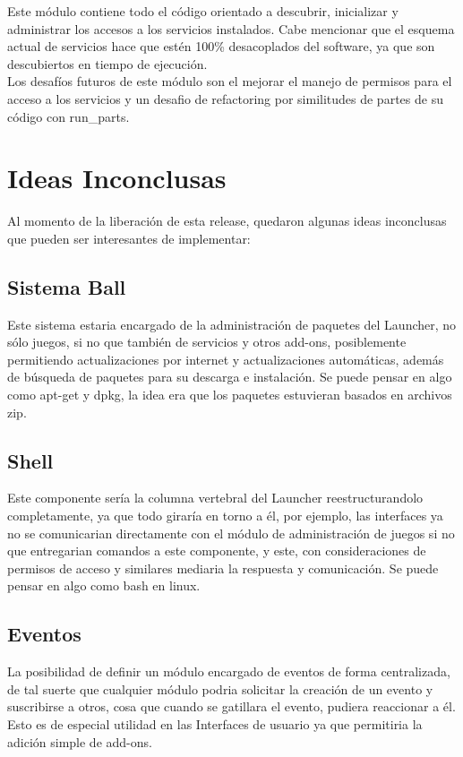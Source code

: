 \documentclass[language=spanish]{article}
\begin{document}
Este módulo contiene todo el código orientado a descubrir, inicializar y administrar los accesos a los servicios instalados. Cabe mencionar que el esquema actual de servicios hace que estén 100\% desacoplados del software, ya que son descubiertos en tiempo de ejecución.\\

Los desafíos futuros de este módulo son el mejorar el manejo de permisos para el acceso a los servicios y un desafio de refactoring por similitudes de partes de su código con run\_parts.

\section{Ideas Inconclusas}

Al momento de la liberación de esta release, quedaron algunas ideas inconclusas que pueden ser interesantes de implementar:

\subsection{Sistema Ball}

Este sistema estaria encargado de la administración de paquetes del Launcher, no sólo juegos, si no que también de servicios y otros add-ons, posiblemente permitiendo actualizaciones por internet y actualizaciones automáticas, además de búsqueda de paquetes para su descarga e instalación. Se puede pensar en algo como apt-get y dpkg, la idea era que los paquetes estuvieran basados en archivos zip.

\subsection{Shell}

Este componente sería la columna vertebral del Launcher reestructurandolo completamente, ya que todo giraría en torno a él, por ejemplo, las interfaces ya no se comunicarian directamente con el módulo de administración de juegos si no que entregarian comandos a este componente, y este, con consideraciones de permisos de acceso y similares mediaria la respuesta y comunicación. Se puede pensar en algo como bash en linux.

\subsection{Eventos}

La posibilidad de definir un módulo encargado de eventos de forma centralizada, de tal suerte que cualquier módulo podria solicitar la creación de un evento y suscribirse a otros, cosa que cuando se gatillara el evento, pudiera reaccionar a él. Esto es de especial utilidad en las Interfaces de usuario ya que permitiria la adición simple de add-ons.
\end{document}

